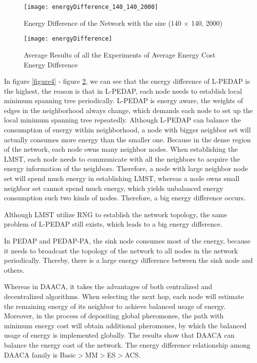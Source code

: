 \documentclass{elsarticle}
\begin{document}
\begin{figure}
\centering
  \texttt{[image: energyDifference\_140\_140\_2000]}\\
  \caption{Energy Difference of the Network with the size (140 $\times$ 140, 2000)}\label{figure5}
\end{figure}

\begin{figure}
\centering
  \texttt{[image: energyDifference]}\\
  \caption{Average Results of all the Experiments of Average Energy Cost Energy Difference}\label{figure6}
\end{figure}
In figure \ref{figure4} - figure \ref{figure6}, we can see that the energy difference of L-PEDAP is the highest, the reason is that in L-PEDAP, each node needs to establish local minimum spanning tree periodically. L-PEDAP is energy aware, the weights of edges in the neighborhood always change, which demands each node to set up the local minimum spanning tree repeatedly. Although L-PEDAP can balance the consumption of energy within neighborhood, a node with bigger neighbor set will actually consumes more energy than the smaller one. Because in the dense region of the network, each node owns many neighbor nodes. When establishing the LMST, each node needs to communicate with all the neighbors to acquire the energy information of the neighbors. Therefore, a node with large neighbor node set will spend much energy in establishing LMST, whereas a node owns small neighbor set cannot spend much energy, which yields unbalanced energy consumption such two kinds of nodes. Therefore, a big energy difference occurs.

Although LMST utilize RNG to establish the network topology, the same problem of L-PEDAP still exists, which leads to a big energy difference.

In PEDAP and PEDAP-PA, the sink node consumes most of the energy, because it needs to broadcast the topology of the network to all nodes in the network periodically. Thereby, there is a large energy difference between the sink node and others.

Whereas in DAACA, it takes the advantages of both centralized and decentralized algorithms. When selecting the next hop, each node will estimate the remaining energy of its neighbor to achieve balanced usage of energy. Moreover, in the process of depositing global pheromones, the path with minimum energy cost will obtain additional pheromones, by which the balanced usage of energy is implemented globally. The results show that DAACA can balance the energy cost of the network. The energy difference relationship among DAACA family is Basic$>$MM$>$ES$>$ACS.
\end{document}
